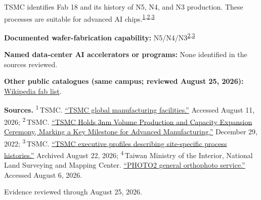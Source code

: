 \begin{minipage}[t][0.90\textheight][t]{\textwidth}
\begin{minipage}[t]{\textwidth}
\begin{minipage}[t]{0.32\textwidth}
\medskip
{\footnotesize TSMC identifies Fab 18 and its history of N5, N4, and N3 production. These processes are suitable for advanced AI chips.\nobreak\textsuperscript{\href{\detokenize{https://www.tsmc.com/english/aboutTSMC/TSMC_Fabs}}{\textcolor{accent}{1}},\href{\detokenize{https://pr.tsmc.com/english/news/2986}}{\textcolor{accent}{2}},\href{\detokenize{https://web.archive.org/web/20260822170034/https://www.tsmc.com/english/aboutTSMC/executives.htm}}{\textcolor{accent}{3}}}\par}
\medskip
{\footnotesize\textbf{Documented wafer-fabrication capability:} N5/N4/N3\nobreak\textsuperscript{\href{\detokenize{https://pr.tsmc.com/english/news/2986}}{\textcolor{accent}{2}},\href{\detokenize{https://web.archive.org/web/20260822170034/https://www.tsmc.com/english/aboutTSMC/executives.htm}}{\textcolor{accent}{3}}}\par}
\end{minipage}
\end{minipage}
\par\vspace{0.65em}
\medskip
{\footnotesize\textbf{Named data-center AI accelerators or programs:} None identified in the sources reviewed.\par}
\smallskip
{\sffamily\scriptsize\color{black!62}\textbf{Other public catalogues (same campus; reviewed August 25, 2026):} \href{\detokenize{https://en.wikipedia.org/w/index.php?title=List_of_semiconductor_fabrication_plants&oldid=1370451124}\#\detokenize{Open_plants}}{Wikipedia fab list}.\par}
\medskip
{\sffamily\scriptsize\setlength{\emergencystretch}{1.5em}\textbf{Sources.} \textsuperscript{1}\,TSMC. \href{\detokenize{https://www.tsmc.com/english/aboutTSMC/TSMC_Fabs}}{\enquote{TSMC global manufacturing facilities.}} Accessed August 11, 2026; \textsuperscript{2}\,TSMC. \href{\detokenize{https://pr.tsmc.com/english/news/2986}}{\enquote{TSMC Holds 3nm Volume Production and Capacity Expansion Ceremony, Marking a Key Milestone for Advanced Manufacturing.}} December 29, 2022; \textsuperscript{3}\,TSMC. \href{\detokenize{https://web.archive.org/web/20260822170034/https://www.tsmc.com/english/aboutTSMC/executives.htm}}{\enquote{TSMC executive profiles describing site-specific process histories.}} Archived August 22, 2026; \textsuperscript{4}\,Taiwan Ministry of the Interior, National Land Surveying and Mapping Center. \href{\detokenize{https://maps.nlsc.gov.tw/S09SOA/pro/Wms_ajax_list.jsp}}{\enquote{PHOTO2 general orthophoto service.}} Accessed August 6, 2026.\par}
\vfill
\noindent{\color{hairline}\rule{\linewidth}{0.4pt}}\par\smallskip
{\sffamily\scriptsize\color{black!58} Evidence reviewed through August 25, 2026.\par}
\end{minipage}
